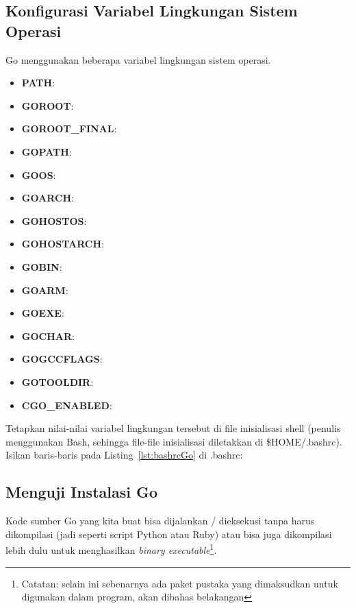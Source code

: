 

\subsection{Konfigurasi Variabel Lingkungan Sistem Operasi}

Go menggunakan beberapa variabel lingkungan sistem operasi. 

\begin{itemize}
	\item \textbf{PATH}:
	\item \textbf{GOROOT}: 
	\item \textbf{GOROOT\_FINAL}: 
	\item \textbf{GOPATH}:
	\item \textbf{GOOS}: 
	\item \textbf{GOARCH}: 
	\item \textbf{GOHOSTOS}: 
	\item \textbf{GOHOSTARCH}: 
	\item \textbf{GOBIN}: 
	\item \textbf{GOARM}:
	\item \textbf{GOEXE}:
	\item \textbf{GOCHAR}:
	\item \textbf{GOGCCFLAGS}:
	\item \textbf{GOTOOLDIR}:
	\item \textbf{CGO\_ENABLED}:
\end{itemize}

Tetapkan nilai-nilai variabel lingkungan tersebut di file inisialisasi shell (penulis menggunakan Bash, sehingga file-file inisialisasi diletakkan di \$HOME/.bashrc). Isikan baris-baris pada Listing~\ref{lst:bashrcGo} di .bashrc:



\subsection{Menguji Instalasi Go}

Kode sumber Go yang kita buat bisa dijalankan / dieksekusi tanpa harus dikompilasi (jadi seperti script Python atau Ruby) atau bisa juga dikompilasi lebih dulu untuk menghasilkan \textit{binary executable}\footnote{Catatan: selain ini sebenarnya ada paket pustaka yang dimaksudkan untuk digunakan dalam program, akan dibahas belakangan}. 

